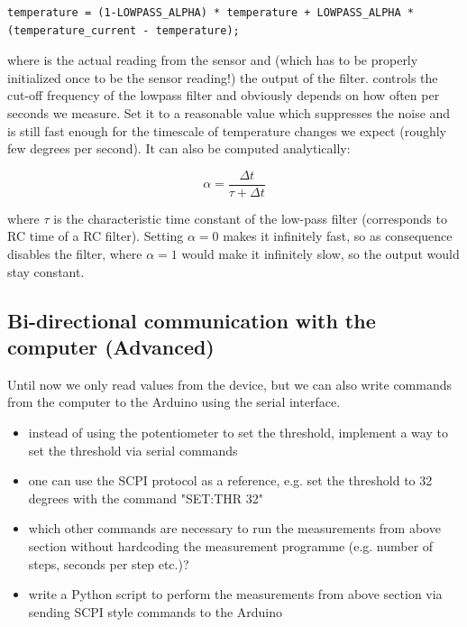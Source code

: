 \noindent\begin{minipage}{\textwidth}
\begin{lstlisting}[language=Arduino]
temperature = (1-LOWPASS_ALPHA) * temperature + LOWPASS_ALPHA * (temperature_current - temperature);
\end{lstlisting}
\end{minipage}

where  is the actual reading from the sensor and  (which has to be properly initialized once to be the sensor reading!) the output of the filter.  controls the cut-off frequency of the lowpass filter and obviously depends on how often per seconds we measure. Set it to a reasonable value which suppresses the noise and is still fast enough for the timescale of temperature changes we expect (roughly few degrees per second). It can also be computed analytically:

\begin{equation}
\alpha = \frac{\Delta t}{\tau + \Delta t}
\end{equation}

where $\tau$ is the characteristic time constant of the low-pass filter (corresponds to RC time of a RC filter). Setting $\alpha = 0$ makes it infinitely fast, so as consequence disables the filter, where $\alpha = 1$ would make it infinitely slow, so the output would stay constant.

\subsection{Bi-directional communication with the computer (Advanced)}
Until now we only read values from the device, but we can also write commands from the computer to the Arduino using the serial interface.
\begin{itemize}
	\item instead of using the potentiometer to set the threshold, implement a way to set the threshold via serial commands
	\item one can use the SCPI protocol as a reference, e.g. set the threshold to 32 degrees with the command "SET:THR 32"
	\item which other commands are necessary to run the measurements from above section without hardcoding the measurement programme (e.g. number of steps, seconds per step etc.)?
	\item write a Python script to perform the measurements from above section via sending SCPI style commands to the Arduino
\end{itemize}


